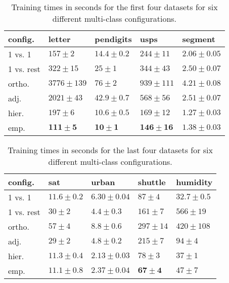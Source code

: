 \begin{table}
	\caption{Training times in seconds for the first four datasets for six different multi-class configurations.}\label{training1}
\begin{tabular}{|l|llll|}
\hline
config. & letter & pendigits & usps & segment \\
\hline\hline
1 vs. 1 & $157 \pm 2 $ & $14.4 \pm 0.2 $ & $244 \pm 11 $ & $2.06 \pm 0.05 $ \\
1 vs. rest & $322 \pm 15 $ & $25 \pm 1 $ & $344 \pm 43 $ & $2.50 \pm 0.07 $ \\
ortho. & $3776 \pm 139 $ & $76 \pm 2 $ & $939 \pm 111 $ & $4.21 \pm 0.08 $ \\
adj. & $2021 \pm 43 $ & $42.9 \pm 0.7 $ & $568 \pm 56 $ & $2.51 \pm 0.07 $ \\
	hier. & $197 \pm 6 $ & $10.6 \pm 0.5 $ & $169 \pm 12 $ & $\mathbf{1.27 \pm 0.03}$ \\
	emp. & $\mathbf{111 \pm 5} $ & $\mathbf{10 \pm 1} $ & $\mathbf{146 \pm 16} $ & $1.38 \pm 0.03 $ \\
\hline
\end{tabular}
\end{table}

\begin{table}
\caption{Training times in seconds for the last four datasets for six different multi-class configurations.}
\begin{tabular}{|l|llll|}
\hline
config. & sat & urban & shuttle & humidity\\
\hline\hline
	1 vs. 1 & $11.6 \pm 0.2 $ & $6.30 \pm 0.04 $ & $87 \pm 4 $ & $\mathbf{32.7 \pm 0.5}$ \\
1 vs. rest & $30 \pm 2 $ & $4.4 \pm 0.3 $ & $161 \pm 7 $ & $566 \pm 19 $ \\
ortho. & $57 \pm 4 $ & $8.8 \pm 0.6 $ & $297 \pm 14 $ & $420 \pm 108 $ \\
adj. & $29 \pm 2 $ & $4.8 \pm 0.2 $ & $215 \pm 7 $ & $94 \pm 4 $ \\
	hier. & $11.3 \pm 0.4 $ & $\mathbf{2.13 \pm 0.03}$ & $78 \pm 3 $ & $37 \pm 1$ \\
	emp. & $\mathbf{11.1 \pm 0.8}$ & $2.37 \pm 0.04 $ & $\mathbf{67 \pm 4}$ & $47 \pm 7 $ \\
\hline
\end{tabular}
\end{table}

